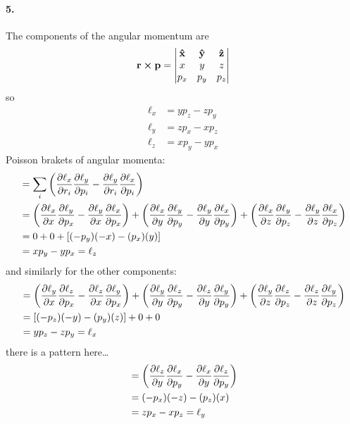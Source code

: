 \documentclass[../hw.tex]{subfiles}
\begin{document}
\paragraph*{5.} The components of the angular momentum are
\begin{align*}
    \vb r \cross \vb p &= \mqty| \vu x & \vu y & \vu z \\ x & y & z \\ p_x & p_y & p_z | \\
\end{align*}
so
\begin{align*}
    \ell_x &= y p_z - z p_y \\
    \ell_y &= z p_x - x p_z \\
    \ell_z &= x p_y - y p_x
\end{align*}
Poisson brakets of angular momenta:
\begin{align*}
    [\ell_x, \ell_y] &= 
    \sum_i \qt(\pdv{\ell_x}{r_i} \pdv{\ell_y}{p_i} - \pdv{\ell_y}{r_i} \pdv{\ell_x}{p_i}) \\
    &= \qt(\pdv{\ell_x}{x} \pdv{\ell_y}{p_x} - \pdv{\ell_y}{x} \pdv{\ell_x}{p_x})
        + \qt(\pdv{\ell_x}{y} \pdv{\ell_y}{p_y} - \pdv{\ell_y}{y} \pdv{\ell_x}{p_y})
        + \qt(\pdv{\ell_x}{z} \pdv{\ell_y}{p_z} - \pdv{\ell_y}{z} \pdv{\ell_x}{p_z}) \\
    &= 0 + 0 + [(-p_y)(-x) - (p_x)(y)] \\
    &= x p_y - y p_x = \ell_z
\end{align*}
and similarly for the other components:
\begin{align*}
    [\ell_y, \ell_z] &= \qt(\pdv{\ell_y}{x} \pdv{\ell_z}{p_x} - \pdv{\ell_z}{x} \pdv{\ell_y}{p_x})
        + \qt(\pdv{\ell_y}{y} \pdv{\ell_z}{p_y} - \pdv{\ell_z}{y} \pdv{\ell_y}{p_y})
        + \qt(\pdv{\ell_y}{z} \pdv{\ell_z}{p_z} - \pdv{\ell_z}{z} \pdv{\ell_y}{p_z}) \\
        &= [(-p_z)(-y) - (p_y)(z)] + 0 + 0 \\
        &= y p_z - z p_y = \ell_x
\end{align*}
there is a pattern here\dots
\begin{align*}
    [\ell_z, \ell_x] &= \qt(\pdv{\ell_z}{y} \pdv{\ell_x}{p_y} - \pdv{\ell_x}{y} \pdv{\ell_z}{p_y}) \\
        &= (-p_x)(-z) - (p_z)(x) \\
        &= z p_x - x p_z = \ell_y
\end{align*}
\end{document}

